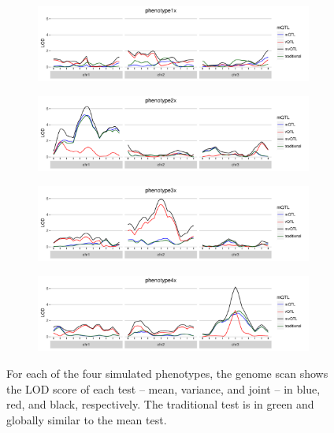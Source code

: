 \documentclass[9pt,twocolumn,twoside]{gsag3jnl}
\begin{document}
\begin{figure}[ht!]
    \begin{subfigure}{0.5\textwidth}
        \includegraphics[width=\textwidth]{images/LOD_scan_phenotype1x.pdf}
    \end{subfigure}

    \begin{subfigure}[b]{0.5\textwidth}
        \includegraphics[width=\textwidth]{images/LOD_scan_phenotype2x.pdf}
    \end{subfigure}

    \begin{subfigure}[b]{0.5\textwidth}
        \includegraphics[width=\textwidth]{images/LOD_scan_phenotype3x.pdf}
    \end{subfigure}
    
    \begin{subfigure}[b]{0.5\textwidth}
        \includegraphics[width=\textwidth]{images/LOD_scan_phenotype4x.pdf}
    \end{subfigure}
    
    \caption{For each of the four simulated phenotypes, the genome scan shows the LOD score of each test -- mean, variance, and joint -- in blue, red, and black, respectively.  The traditional test is in green and globally similar to the mean test. \label{fig:apdx_lod_score_scans}}
\end{figure}
\end{document}
